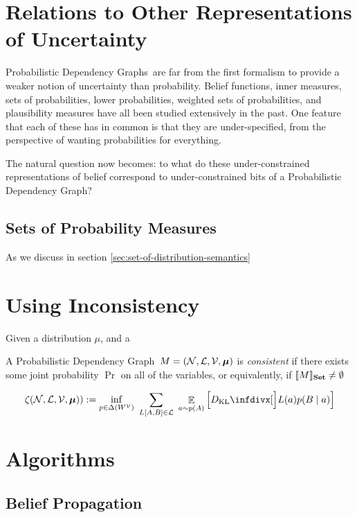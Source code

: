 \documentclass{article}
\newcommand{\modelname}{Probabilistic Dependency Graph}
\newcommand{\modelnames}{Probabilistic Dependency Graphs}
\newcommand\Set{\textbf{Set}}
\newcommand\bmu{\boldsymbol{\mu}}
\begin{document}
	\section{Relations to Other Representations of Uncertainty}
	\modelnames\ are far from the first formalism to provide a weaker notion of uncertainty than probability. Belief functions, inner measures, sets of probabilities, lower probabilities, weighted sets of probabilities, and plausibility measures have all been studied extensively in the past. One feature that each of these has in common is that they are under-specified, from the perspective of wanting probabilities for everything.

	The natural question now becomes: to what do these under-constrained representations of belief correspond to under-constrained bits of a \modelname?
	

	

	\subsection{Sets of Probability Measures}
	As we discuss in section \ref{sec:set-of-distribution-semantics}



	\section{Using Inconsistency}

	Given a distribution $\mu$, and a
	
	\begin{defn}[consistency]
		A \modelname\ $M = ({\cal N, L, V}, \bmu)$ is \emph{consistent} if there exists some joint probability $\Pr$ on all of the variables, or equivalently, if $\bbr{M}_\Set \neq \emptyset$
	\end{defn}

	\begin{equation}
		\zeta({\cal N, L, V}, \bmu)) := \inf_{p \in \Delta(W^{\mathcal V})}~\sum_{L[A, B]\in \cal L}~\mathop{\mathbb E}_{a \sim p(A)} \left[\kldiv[\Big]{L(a) }{ p(B \mid a) } \right]
	\end{equation}
	

	\section{Algorithms}
	\subsection{Belief Propagation}
\end{document}
